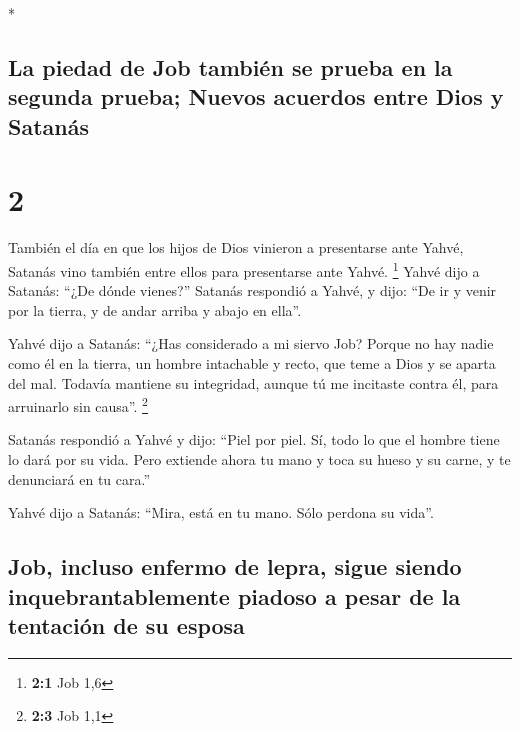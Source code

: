 \begin{paracol}{2}
\begin{otherlanguage}{english}
\end{otherlanguage}

\switchcolumn[0]*

\hypertarget{la-piedad-de-job-tambiuxe9n-se-prueba-en-la-segunda-prueba-nuevos-acuerdos-entre-dios-y-satanuxe1s}{%
\subsection{La piedad de Job también se prueba en la segunda prueba;
Nuevos acuerdos entre Dios y
Satanás}\label{la-piedad-de-job-tambiuxe9n-se-prueba-en-la-segunda-prueba-nuevos-acuerdos-entre-dios-y-satanuxe1s}}

\hypertarget{section-2}{%
\section{2}\label{section-2}}

 También el día en que los hijos de Dios vinieron a
presentarse ante Yahvé, Satanás vino también entre ellos para
presentarse ante Yahvé. \footnote{\textbf{2:1} Job 1,6} 
Yahvé dijo a Satanás: ``¿De dónde vienes?'' Satanás respondió a Yahvé, y
dijo: ``De ir y venir por la tierra, y de andar arriba y abajo en
ella''.

 Yahvé dijo a Satanás: ``¿Has considerado a mi siervo Job?
Porque no hay nadie como él en la tierra, un hombre intachable y recto,
que teme a Dios y se aparta del mal. Todavía mantiene su integridad,
aunque tú me incitaste contra él, para arruinarlo sin causa''.
\footnote{\textbf{2:3} Job 1,1}

 Satanás respondió a Yahvé y dijo: ``Piel por piel. Sí,
todo lo que el hombre tiene lo dará por su vida.  Pero
extiende ahora tu mano y toca su hueso y su carne, y te denunciará en tu
cara.''

 Yahvé dijo a Satanás: ``Mira, está en tu mano. Sólo
perdona su vida''.

\hypertarget{job-incluso-enfermo-de-lepra-sigue-siendo-inquebrantablemente-piadoso-a-pesar-de-la-tentaciuxf3n-de-su-esposa}{%
\subsection{Job, incluso enfermo de lepra, sigue siendo
inquebrantablemente piadoso a pesar de la tentación de su
esposa}\label{job-incluso-enfermo-de-lepra-sigue-siendo-inquebrantablemente-piadoso-a-pesar-de-la-tentaciuxf3n-de-su-esposa}}


\end{paracol}

